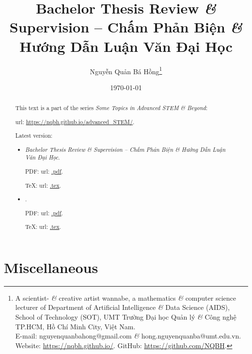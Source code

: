 \documentclass{article}
\title{Bachelor Thesis Review {\it\&} Supervision -- Chấm Phản Biện {\it\&} Hướng Dẫn Luận Văn Đại Học}
\author{Nguyễn Quản Bá Hồng\footnote{A scientist- {\it\&} creative artist wannabe, a mathematics {\it\&} computer science lecturer of Department of Artificial Intelligence {\it\&} Data Science (AIDS), School of Technology (SOT), UMT Trường Đại học Quản lý {\it\&} Công nghệ TP.HCM, Hồ Chí Minh City, Việt Nam.\\E-mail: {\sf nguyenquanbahong@gmail.com} {\it\&} {\sf hong.nguyenquanba@umt.edu.vn}. Website: \url{https://nqbh.github.io/}. GitHub: \url{https://github.com/NQBH}.}}
\date{\today}
\begin{document}
\maketitle
\begin{abstract}
	This text is a part of the series {\it Some Topics in Advanced STEM \& Beyond}:
	
	{\sc url}: \url{https://nqbh.github.io/advanced_STEM/}.
	
	Latest version:
	\begin{itemize}
		\item {\it Bachelor Thesis Review \& Supervision -- Chấm Phản Biện \& Hướng Dẫn Luận Văn Đại Học}.
		
		PDF: {\sc url}: \url{.pdf}.
		
		\TeX: {\sc url}: \url{.tex}.
		\item {\it }.
		
		PDF: {\sc url}: \url{.pdf}.
		
		\TeX: {\sc url}: \url{.tex}.
	\end{itemize}
\end{abstract}
\tableofcontents


\section{}


\section{Miscellaneous}


\printbibliography[heading=bibintoc]
	
\end{document}
